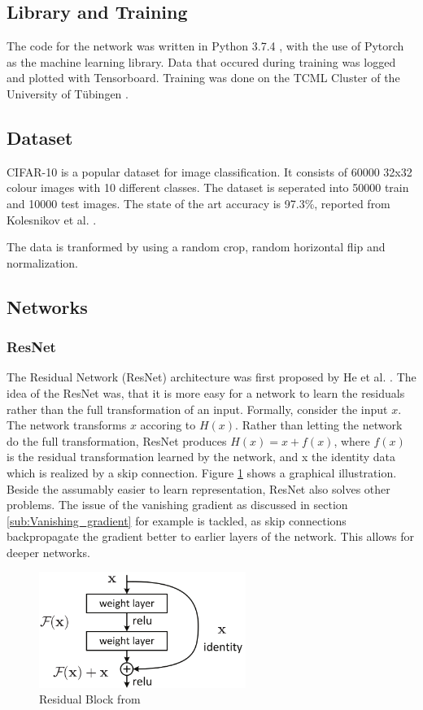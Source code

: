 \subsection{Library and Training}
The code for the network was written in Python 3.7.4 , with the use of Pytorch
\cite{NEURIPS2019_9015} as the machine learning library. Data that occured
during training was logged and plotted with Tensorboard. Training was done on
the TCML Cluster of the University of Tübingen \cite{TCML}.

\subsection{Dataset}
CIFAR-10 \cite{CIFAR-10} is a popular dataset for image classification. It
consists of 60000 32x32 colour images with 10 different classes. The dataset is
seperated into 50000 train and 10000 test images. The state of the art accuracy
is 97.3\%, reported from Kolesnikov et al. \cite{kolesnikov2019big}.

The data is tranformed by using a random crop, random horizontal flip and
normalization.


\subsection{Networks}
\subsubsection{ResNet}\label{sub:ResNet}
The Residual Network (ResNet) architecture was first proposed by He et al.
\cite{he2016deep}. The idea of the ResNet was, that it is more easy for a
network to learn the residuals rather than the full transformation of an input.
Formally, consider the input $x$. The network transforms $x$ accoring to $H(x)$.
Rather than letting the network do the full transformation, ResNet produces
$H(x)= x +f(x)$, where $f(x)$ is the residual transformation learned by the
network, and x the identity data which is realized by a skip connection. Figure
\ref{fig:Residual_Block} shows a graphical illustration. Beside the assumably
easier to learn representation, ResNet also solves other problems. The issue of
the vanishing gradient as discussed in section \ref{sub:Vanishing_gradient} for
example is tackled, as skip connections backpropagate the gradient better to
earlier layers of the network. This allows for deeper networks.

\begin{figure}[h]\label{fig:Residual_Block}
    \centering
    \includegraphics[width=0.6\textwidth]{images/Residual_Block.png}
    \caption{Residual Block from \cite[Page 2]{he2016deep}}
\end{figure}

